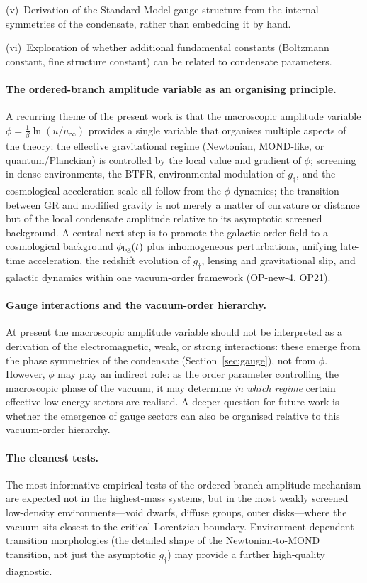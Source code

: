 \documentclass[11pt,a4paper]{article}
\numberwithin{equation}{section}
\begin{document}
(v)~Derivation of the Standard Model gauge structure from the internal
symmetries of the condensate, rather than embedding it by hand.

(vi)~Exploration of whether additional fundamental constants
(Boltzmann constant, fine structure constant) can be related to
condensate parameters.

\paragraph{The ordered-branch amplitude variable as an organising principle.}
A recurring theme of the present work is that the
macroscopic amplitude variable $\phi=\frac{1}{\beta}\ln(u/u_\infty)$
provides a single variable that organises multiple
aspects of the theory:
the effective gravitational regime (Newtonian, MOND-like,
or quantum/Planckian) is controlled by the local value and
gradient of $\phi$;
screening in dense environments, the BTFR, environmental
modulation of $g_\dagger$, and the cosmological acceleration
scale all follow from the $\phi$-dynamics;
the transition between GR and modified gravity is not
merely a matter of curvature or distance but of the local
condensate amplitude relative to its asymptotic screened background.
A central next step is to promote the galactic order field
to a cosmological background $\phi_{\rm bg}(t)$ plus
inhomogeneous perturbations, unifying late-time acceleration,
the redshift evolution of $g_\dagger$, lensing and
gravitational slip, and galactic dynamics within one
vacuum-order framework (OP-new-4, OP21).

\paragraph{Gauge interactions and the vacuum-order hierarchy.}
At present the macroscopic amplitude variable should not be interpreted
as a derivation of the electromagnetic, weak, or strong
interactions: these emerge from the phase symmetries of the
condensate (Section~\ref{sec:gauge}), not from $\phi$.
However, $\phi$ may play an indirect role: as the order
parameter controlling the macroscopic phase of the vacuum,
it may determine \emph{in which regime} certain effective
low-energy sectors are realised.  A deeper question for
future work is whether the emergence of gauge sectors can
also be organised relative to this vacuum-order hierarchy.

\paragraph{The cleanest tests.}
The most informative empirical tests of the
ordered-branch amplitude mechanism are expected not in the
highest-mass systems, but in the most weakly screened
low-density environments---void dwarfs, diffuse groups,
outer disks---where the vacuum sits closest to the critical
Lorentzian boundary.  Environment-dependent transition
morphologies (the detailed shape of the Newtonian-to-MOND
transition, not just the asymptotic $g_\dagger$) may provide
a further high-quality diagnostic.
\end{document}
